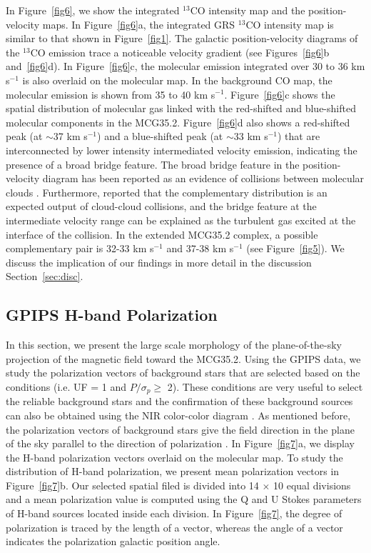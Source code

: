 \documentclass[iop]{emulateapj}
\begin{document}
In Figure~\ref{fig6}, we show the integrated $^{13}$CO intensity map and the position-velocity maps.  
In Figure~\ref{fig6}a, the integrated GRS $^{13}$CO intensity map is similar to that shown in Figure~\ref{fig1}.
The galactic position-velocity diagrams of the $^{13}$CO emission trace a noticeable velocity 
gradient (see Figures~\ref{fig6}b and~\ref{fig6}d). 
In Figure~\ref{fig6}c, the molecular emission integrated over 30 to 36 km s$^{-1}$ is also overlaid on the molecular map. 
In the background CO map, the molecular emission is shown from 35 to 40 km s$^{-1}$. 
Figure~\ref{fig6}c shows the spatial distribution of molecular gas linked with the red-shifted and blue-shifted molecular components in the MCG35.2. 
Figure~\ref{fig6}d also shows a red-shifted peak (at $\sim$37 km s$^{-1}$) and a blue-shifted peak (at $\sim$33 km s$^{-1}$) 
that are interconnected by lower intensity intermediated velocity emission, indicating the presence of a broad bridge feature. 
The broad bridge feature in the position-velocity diagram has been reported as an evidence of collisions 
between molecular clouds \citep{haworth15a,haworth15b}. 
Furthermore, \citet{torii16} reported that the complementary distribution is an expected output of cloud-cloud collisions, 
and the bridge feature at the intermediate velocity range can be explained as the turbulent gas excited at the interface of the collision. 
In the extended MCG35.2 complex, a possible complementary pair is 32-33 km s$^{-1}$ and 37-38 km s$^{-1}$ (see Figure~\ref{fig5}). 
We discuss the implication of our findings in more detail in the discussion Section~\ref{sec:disc}.
%
\subsection{GPIPS H-band Polarization}
\label{subsec:pol}
%
In this section, we present the large scale morphology of the plane-of-the-sky projection of 
the magnetic field toward the MCG35.2. 
Using the GPIPS data, we study the polarization vectors of background stars that are selected 
based on the conditions (i.e. UF = 1 and $P/\sigma_p \ge$ 2). 
These conditions are very useful to select the reliable background stars and the confirmation of 
these background sources can also be obtained using the NIR color-color diagram \citep[e.g.][]{dewangan15}. 
As mentioned before, the polarization vectors of background stars give the field direction in the plane of the sky parallel to the direction of
polarization \citep{davis51}. 
In Figure~\ref{fig7}a, we display the H-band polarization vectors overlaid on the molecular map.  
To study the distribution of H-band polarization, we present mean polarization vectors in Figure~\ref{fig7}b. 
Our selected spatial filed is divided into 14 $\times$ 10 equal divisions 
and a mean polarization value is computed using the Q and U Stokes parameters of H-band sources 
located inside each division. 
In Figure~\ref{fig7}, the degree of polarization is traced by the length of a vector, whereas the angle of a vector indicates 
the polarization galactic position angle. 
\end{document}
